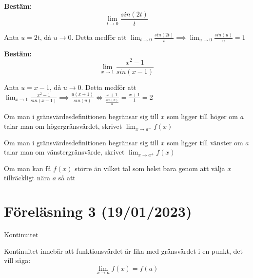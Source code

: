 \documentclass{report}
\begin{document}
\vspace{20pt}
\qs{}
{
\textbf{Bestäm:}
\begin{equation*}
\lim_{t \to 0} \frac{sin(2t)}{t}  
\end{equation*}
}

\sol Anta $ u = 2t $, då $ u \to 0 $. Detta medför att $ \lim_{t \to 0} \frac{sin(2t)}{t} \implies \lim_{u \to 0} \frac{sin(u)}{u} = 1  $  

\vspace{20pt}
\qs{}
{
\textbf{Bestäm:}
\begin{equation*}
\lim_{x \to 1} \frac{x^2-1}{sin(x-1)} 
\end{equation*}
}

\sol Anta $ u = x-1 $, då $ u \to 0 $. Detta medför att $ \lim_{x \to 1} \frac{x^2-1}{sin(x-1)} \implies \frac{u(x+1)}{sin(u)} \iff \frac{x+1}{ \frac{sin(u)}{u} } = \frac{x+1}{1} = 2  $ 

\pagebreak

{
Om man i gränsvärdesdefinitionen begränsar sig till $ x $ som ligger till höger om $ a $ talar man om högergränsvärdet, skrivet $ \lim_{x \to a^-} f(x) $ 
}

{
Om man i gränsvärdesdefinitionen begränsar sig till $ x $ som ligger till vänster om $ a $ talar man om vänstergränsvärde, skrivet $ \lim_{x \to a^+} f(x) $ 
}

 
\vspace{20pt}
{
Om man kan få $ f(x) $ större än vilket tal som helst bara genom att välja $ x $ tillräckligt nära $ a $ så att 
}

\pagebreak
\section{Föreläsning 3 (19/01/2023)}
Kontinuitet

{
Kontinuitet innebär att funktionsvärdet är lika med gränsvärdet i en punkt, det vill säga:
\begin{equation*}
\lim_{x \to a} f(x) = f(a)
\end{equation*}
}

\end{document}
